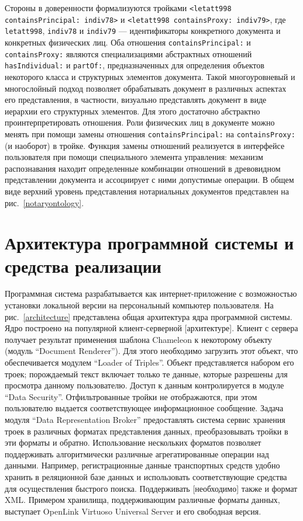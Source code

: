 \documentclass[utf8]{../IncArticle}
\newcommand{\e}[2][fcolor]{\textcolor{pcolor}{[}\textcolor{#1}{#2}\textcolor{pcolor}{]}}
\begin{document}
Стороны в доверенности формализуются тройками \texttt{<letatt998
  containsPrincipal: indiv78>} и \texttt{<letatt998 containsProxy:
  indiv79>}, где \texttt{letatt998}, \texttt{indiv78} и \texttt{indiv79} --- идентификаторы
конкретного документа и конкретных физических лиц.  Оба отношения
\texttt{containsPrincipal:} и  \texttt{containsProxy:} являются
специализациями абстрактных отношений \texttt{hasIndividual:} и
\texttt{partOf:}, предназначенных для определения объектов
некоторого класса и структурных элементов документа.  Такой
многоуровневый и многослойный подход позволяет обрабатывать документ в
различных аспектах его представления, в частности, визуально
представлять документ в виде иерархии его структурных элементов.  Для
этого достаточно абстрактно проинтерпретировать отношения.  Роли
физических лиц в документе можно менять при помощи замены
отношения \texttt{containsPrincipal:} на \texttt{containsProxy:} (и
наоборот) в тройке.  Функция замены отношений реализуется в интерфейсе
пользователя при помощи специального элемента управления: механизм
распознавания находит определенные комбинации отношений в древовидном
представлении документа и ассоциирует с ними допустимые операции.  В
общем виде верхний уровень представления нотариальных документов
представлен на рис.~\ref{notaryontology}.

\section{Архитектура программной системы и средства реализации}

Программная система разрабатывается как интернет-приложение с
возможностью установки локальной версии на персональный компьютер
пользователя.  На рис.~\ref{architecture} представлена общая
архитектура ядра программной системы.  Ядро построено на популярной
клиент-серверной \e{архитектуре}.  Клиент с сервера получает результат
применения шаблона Chameleon к некоторому объекту (модуль “Document
Renderer”).  Для этого необходимо загрузить этот объект, что
обеспечивается модулем “Loader of Triples”.  Объект представляется
набором его троек; порождаемый текст включает только те данные,
которые разрешены для просмотра данному пользователю.  Доступ к данным
контролируется в модуле “Data Security”.  Отфильтрованные тройки не
отображаются, при этом пользователю выдается соответствующее
информационное сообщение.  Задача модуля “Data Representation Broker”
предоставлять система сервис хранения троек в различных форматах
представления данных, преобразовывать тройки в эти форматы и обратно.
Использование нескольких форматов позволяет поддерживать
алгоритмически различные агрегатированные операции над данными.
Например, регистрационные данные транспортных средств удобно хранить в
реляционной базе данных и использовать соответствующие средства для
осуществления быстрого поиска.  Поддерживать \e{необходимо} также и
формат XML.  Примером хранилища, поддерживающим различные форматы
данных, выступает  OpenLink Virtuoso Universal Server \cite{b2:8} и
его свободная версия.
\end{document}
